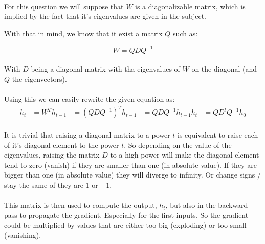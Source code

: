 
\paragraph{}
For this question we will suppose that $W$ is a diagonalizable matrix, which is implied by the fact that it's
eigenvalues are given in the subject.

With that in mind, we know that it exist a matrix $Q$ such as:

\[
    W = Q D Q^{-1}
\]

\paragraph{}
With $D$ being a diagonal matrix with tha eigenvalues of $W$ on the diagonal (and $Q$ the eigenvectors).

\paragraph{}
Using this we can easily rewrite the given equation as:
\begin{align*}
    h_t &= W^T h_{t-1}
        &= (Q D Q^{-1})^T h_{t-1}
        &= Q D Q^{-1} h_{t-1}
    h_t &= Q D^t Q^{-1} h_{0}
\end{align*}

\paragraph{}
It is trivial that raising a diagonal matrix to a power $t$ is equivalent to raise each of it's diagonal element to the
power $t$.
So depending on the value of the eigenvalues, raising the matrix $D$ to a high power will make the diagonal element
tend to zero (vanish) if they are smaller than one (in absolute value).
If they are bigger than one (in absolute value) they will diverge to infinity.
Or change signs / stay the same of they are $1$ or $-1$.

\paragraph{}
This matrix is then used to compute the output, $h_t$, but also in the backward pass to propagate the gradient.
Especially for the first inputs.
So the gradient could be multiplied by values that are either too big (exploding) or too small (vanishing).

